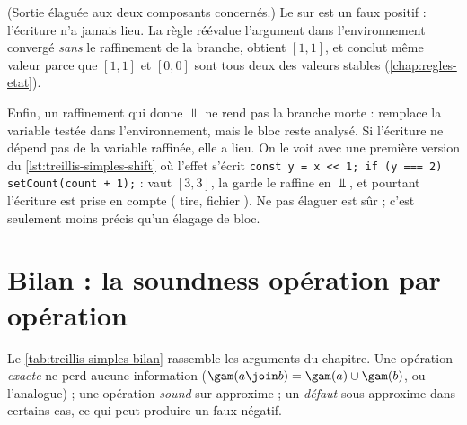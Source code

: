 (Sortie élaguée aux deux composants concernés.) Le \Warning{}
 sur  est un faux positif :
l'écriture n'a jamais lieu. La règle réévalue l'argument  dans
l'environnement convergé \emph{sans} le raffinement de la branche, obtient
$[1,1]$, et conclut \og même valeur\fg{} parce que $[1,1]$ et $[0,0]$ sont tous
deux des valeurs \og stables\fg{} (\cref{chap:regles-etat}).

Enfin, un raffinement qui donne $\Bot$ ne rend pas la branche morte :
 remplace la variable testée dans
l'environnement, mais le bloc reste analysé. Si l'écriture ne dépend pas de
la variable raffinée, elle a lieu. On le voit avec une première version du
\cref{lst:treillis-simples-shift} où l'effet s'écrit
\texttt{const y = x <{}< 1; if (y === 2) setCount(count + 1);} :  vaut
$[3,3]$, la garde le raffine en $\Bot$, et pourtant l'écriture
 est prise en compte ( tire, fichier
). Ne pas élaguer est sûr ; c'est seulement moins
précis qu'un élagage de bloc.

\section{Bilan : la soundness opération par opération}
\label{sec:treillis-simples-soundness}

Le \cref{tab:treillis-simples-bilan} rassemble les arguments du chapitre.
Une opération \emph{exacte} ne perd aucune information
($\gam(a \join b) = \gam(a) \cup \gam(b)$, ou l'analogue) ; une opération
\emph{sound} sur-approxime ; un \emph{défaut} sous-approxime dans certains
cas, ce qui peut produire un faux négatif.

